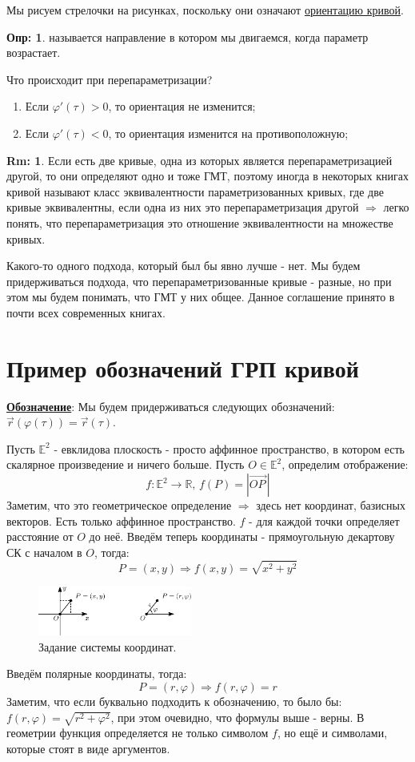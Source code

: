 \documentclass[12pt]{article}
\newcommand{\MR}{\mathbb{R}}
\newcommand{\MBE}{\mathbb{E}}
\theoremstyle{definition}
\newtheorem{defn}{Опр:}
\newtheorem{rem}{Rm:}
\newcommand{\vecm}[1]{\overrightarrow{#1\,}}
\begin{document}
Мы рисуем стрелочки на рисунках, поскольку они означают \uline{ориентацию кривой}.
\begin{defn}
	 называется направление в котором мы двигаемся, когда параметр возрастает.
\end{defn}
Что происходит при перепараметризации? 
\begin{enumerate}[label=\arabic*)]
	\item Если $\varphi'(\tau) > 0$, то ориентация не изменится;
	\item Если $\varphi'(\tau) < 0$, то ориентация изменится на противоположную;
\end{enumerate}

\begin{rem}
	Если есть две кривые, одна из которых является перепараметризацией другой, то они определяют одно и тоже ГМТ, поэтому иногда в некоторых книгах кривой называют класс эквивалентности параметризованных кривых, где две кривые эквивалентны, если одна из них это перепараметризация другой $\Rightarrow$ легко понять, что перепараметризация это отношение эквивалентности на множестве кривых.
	
	Какого-то одного подхода, который был бы явно лучше - нет. Мы будем придерживаться подхода, что перепараметризованные кривые - разные, но при этом мы будем понимать, что ГМТ у них общее. Данное соглашение принято в почти всех современных книгах.
\end{rem}
\newpage

\section*{Пример обозначений ГРП кривой}

\textbf{\uline{Обозначение}}: Мы будем придерживаться следующих обозначений: $\vec{r}(\varphi(\tau)) = \vec{r}(\tau)$.

Пусть $\MBE^2$ - евклидова плоскость - просто аффинное пространство, в котором есть скалярное произведение и ничего больше. Пусть $O \in \MBE^2$, определим отображение:
$$
	f \colon \MBE^2 \to \MR, \, f(P) = \left|\vecm{OP}\right|
$$
Заметим, что это геометрическое определение $\Rightarrow$ здесь нет координат, базисных векторов. Есть только аффинное пространство. $f$ - для каждой точки определяет расстояние от $O$ до неё. Введём теперь координаты - прямоугольную декартову СК с началом в $O$, тогда:
$$
	P = (x,y) \Rightarrow f(x,y) = \sqrt{x^2 + y^2}
$$
\begin{figure}[H]
	\centering
	\includegraphics[width=0.45\textwidth]{CDGL1_7.eps}
	\caption{Задание системы координат.}
	\label{1_7}
\end{figure}
Введём полярные координаты, тогда:
$$
	P = (r,\varphi) \Rightarrow f(r,\varphi) = r
$$
Заметим, что если буквально подходить к обозначению, то было бы: $f(r,\varphi) = \sqrt{r^2 + \varphi^2}$, при этом очевидно, что формулы выше - верны. В геометрии функция определяется не только символом $f$, но ещё и символами, которые стоят в виде аргументов.
\end{document}
